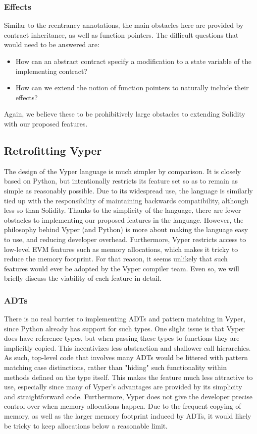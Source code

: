\subsubsection{Effects}
Similar to the reentrancy annotations, the main obstacles here are provided by contract inheritance, as well as function pointers. The difficult questions that would need to be answered are:
\begin{itemize}
  \item How can an abstract contract specify a modification to a state variable of the implementing contract?
  \item How can we extend the notion of function pointers to naturally include their effects?
\end{itemize}
Again, we believe these to be prohibitively large obstacles to extending Solidity with our proposed features.

\subsection{Retrofitting Vyper}
The design of the Vyper language is much simpler by comparison. It is closely based on Python, but intentionally restricts its feature set so as to remain as simple as reasonably possible. Due to its widespread use, the language is similarly tied up with the responsibility of maintaining backwards compatibility, although less so than Solidity. Thanks to the simplicity of the language, there are fewer obstacles to implementing our proposed features in the language. However, the philosophy behind Vyper (and Python) is more about making the language easy to use, and reducing developer overhead. Furthermore, Vyper restricts access to low-level EVM features such as memory allocations, which makes it tricky to reduce the memory footprint. For that reason, it seems unlikely that such features would ever be adopted by the Vyper compiler team. Even so, we will briefly discuss the viability of each feature in detail.

\subsubsection{ADTs}
There is no real barrier to implementing ADTs and pattern matching in Vyper, since Python already has support for such types. One slight issue is that Vyper does have reference types, but when passing these types to functions they are implicitly copied. This incentivizes less abstraction and shallower call hierarchies. As such, top-level code that involves many ADTs would be littered with pattern matching case distinctions, rather than "hiding" such functionality within methods defined on the type itself. This makes the feature much less attractive to use, especially since many of Vyper's advantages are provided by its simplicity and straightforward code. Furthermore, Vyper does not give the developer precise control over when memory allocations happen. Due to the frequent copying of memory, as well as the larger memory footprint induced by ADTs, it would likely be tricky to keep allocations below a reasonable limit.

